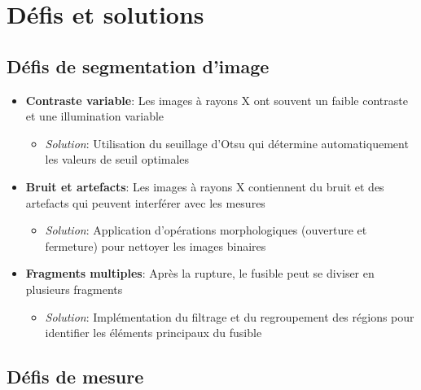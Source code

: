 \documentclass[12pt,a4paper]{article}
\begin{document}
\section{Défis et solutions}

\subsection{Défis de segmentation d'image}

\begin{itemize}
    \item \textbf{Contraste variable}: Les images à rayons X ont souvent un faible contraste et une illumination variable
    \begin{itemize}
        \item \textit{Solution}: Utilisation du seuillage d'Otsu qui détermine automatiquement les valeurs de seuil optimales
    \end{itemize}
    
    \item \textbf{Bruit et artefacts}: Les images à rayons X contiennent du bruit et des artefacts qui peuvent interférer avec les mesures
    \begin{itemize}
        \item \textit{Solution}: Application d'opérations morphologiques (ouverture et fermeture) pour nettoyer les images binaires
    \end{itemize}
    
    \item \textbf{Fragments multiples}: Après la rupture, le fusible peut se diviser en plusieurs fragments
    \begin{itemize}
        \item \textit{Solution}: Implémentation du filtrage et du regroupement des régions pour identifier les éléments principaux du fusible
    \end{itemize}
\end{itemize}

\subsection{Défis de mesure}
\end{document}
